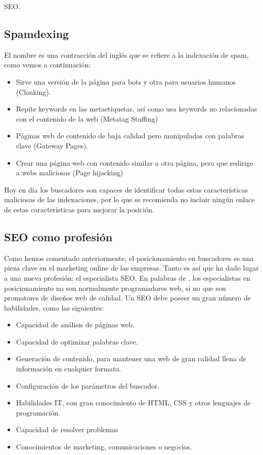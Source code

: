 \begin{section}{SEO.}
		\subsection{Spamdexing}
		El nombre es una contracción del inglés que se refiere a la indexación de spam, como vemos a continuación:
		\begin{itemize}
			\item Sirve una versión de la página para bots y otra para usuarios humanos (Cloaking).
			\item Repite keywords en las metaetiquetas, así como usa keywords no relacionadas con el contenido de la web (Metatag Stuffing)
			\item Páginas web de contenido de baja calidad pero manipuladas con palabras clave (Gateway Pages).
			\item Crear una página web con contenido similar a otra página, pero que redirige a webs maliciosas (Page hijacking)
		\end{itemize}
		
		Hoy en día los buscadores son capaces de identificar todas estas características maliciosas de las indexaciones, por lo que se recomienda no incluir ningún enlace de estas características para mejorar la posición.
	\end{section}
	
	\subsection{SEO como profesión}
	Como hemos comentado anteriormente, el posicionamiento en buscadores es una pieza clave en el marketing online de las empresas. Tanto es así que ha dado lugar a una nueva profesión: el especialista SEO. En palabras de \cite{seo-prof}, los especialistas en posicionamiento no son normalmente programadores web, si no que son promotores de diseños web de calidad. Un SEO debe poseer un gran número de habilidades, como las siguientes:
	
	\begin{itemize}
		\item Capacidad de análisis de páginas web.
		\item Capacidad de optimizar palabras clave.
		\item Generación de contenido, para mantener una web de gran calidad llena de información en cualquier formato.
		\item Configuración de los parámetros del buscador.
		\item Habilidades IT, con gran conocimiento de HTML, CSS y otros lenguajes de programación.
		\item Capacidad de resolver problemas
		\item Conocimientos de marketing, comunicaciones o negocios.
	\end{itemize}
	
